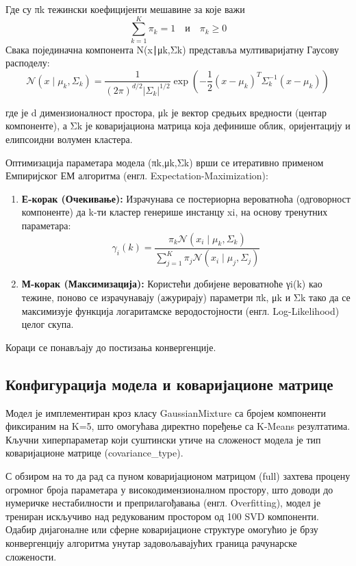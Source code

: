 \documentclass[a4paper,12pt]{report}
\begin{document}
	Где су πk​ тежински коефицијенти мешавине за које важи \[ \sum_{k=1}^{K} \pi_k = 1 \quad \text{и} \quad \pi_k \geq 0 \]Свака појединачна компонента N(x∣μk​,Σk​) представља мултиваријатну Гаусову расподелу:
	$$ \mathcal{N}(x \mid \mu_k, \Sigma_k) = \frac{1}{(2\pi)^{d/2} |\Sigma_k|^{1/2}} \exp \left( -\frac{1}{2} (x - \mu_k)^T \Sigma_k^{-1} (x - \mu_k) \right) $$
	
	где је d димензионалност простора, μk​ је вектор средњих вредности (центар компоненте), а Σk​ је коваријациона матрица која дефинише облик, оријентацију и елипсоидни волумен кластера.
	
	Оптимизација параметара модела (πk​,μk​,Σk​) врши се итеративно применом Емпиријског ЕМ алгоритма (енгл. Expectation-Maximization):
	\begin{enumerate}
	
	\item \textbf{Е-корак (Очекивање):} Израчунава се постериорна вероватноћа (одговорност компоненте) да k-ти кластер генерише инстанцу xi​, на основу тренутних параметара:
	$$ \gamma_i(k) = \frac{\pi_k \mathcal{N}(x_i \mid \mu_k, \Sigma_k)}{\sum_{j=1}^{K} \pi_j \mathcal{N}(x_i \mid \mu_j, \Sigma_j)} $$
	
	\item \textbf{М-корак (Максимизација):} Користећи добијене вероватноће γi​(k) као тежине, поново се израчунавају (ажурирају) параметри πk​, μk​ и Σk​ тако да се максимизује функција логаритамске веродостојности (енгл. Log-Likelihood) целог скупа.
	
	\end{enumerate}
	
	Кораци се понављају до постизања конвергенције.
	
	\subsection{Конфигурација модела и коваријационе матрице}
	Модел је имплементиран кроз класу GaussianMixture са бројем компоненти фиксираним на K=5, што омогућава директно поређење са K-Means резултатима. Кључни хиперпараметар који суштински утиче на сложеност модела је тип коваријационе матрице (covariance\_type).
	
	С обзиром на то да рад са пуном коваријационом матрицом (full) захтева процену огромног броја параметара у високодимензионалном простору, што доводи до нумеричке нестабилности и преприлагођавања (енгл. Overfitting), модел је трениран искључиво над редукованим простором од 100 SVD компоненти. Одабир дијагоналне или сферне коваријационе структуре омогућио је брзу конвергенцију алгоритма унутар задовољавајућих граница рачунарске сложености.
	
\end{document}
